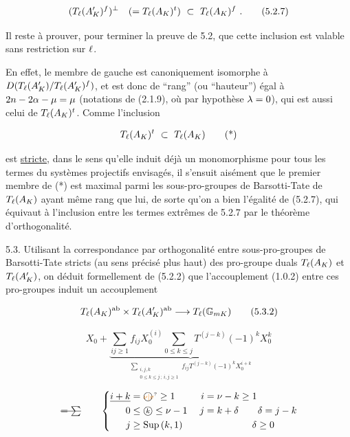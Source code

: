 \[
(T_{\handwritten{\ell}}(A'_K)^f)^{\handwritten{\perp}}\quad(=T_{\handwritten{\ell}}(A_K)^t)\ \handwritten{\subset}\ T_{\handwritten{\ell}}(A_K)^f\ .\tag*{(5.2.7)}
\]

Il reste à prouver, pour terminer la preuve de 5.2, que cette inclusion est valable sans restriction sur $\ell$.

En effet, le membre de gauche est canoniquement isomorphe à $D(T_{\ell}(A'_K)/T_{\ell}(A'_K)^f)$, et est donc de ``rang'' (ou ``hauteur'') égal à $2n-2\alpha-\mu=\mu$ (notations de (2.1.9), où par hypothèse $\lambda=0$), qui est aussi celui de $T_{\ell}(A_K)^t$. Comme l'inclusion

\[
T_{\handwritten{\ell}}(A_K)^t\ \handwritten{\subset}\ T_{\handwritten{\ell}}(A_K)\tag*{(*)}
\]

est \uline{stricte}, dans le sens qu'elle induit déjà un monomorphisme pour tous les termes du systèmes projectifs envisagés, il s'ensuit aisément que le premier membre de (*) est maximal parmi les sous-pro-groupes de Barsotti-Tate de $T_{\ell}(A_K)$ ayant même rang que lui, de sorte qu'on a bien l'égalité de (5.2.7), qui équivaut à l'inclusion entre les termes extrêmes de 5.2.7 par le théorème d'orthogonalité.

5.3. Utilisant la correspondance par orthogonalité entre sous-pro-groupes de Barsotti-Tate stricts (au sens précisé plus haut) des pro-groupe duals $T_{\ell}(A_K)$ et $T_{\ell}(A'_K)$, on déduit formellement de (5.2.2) que l'accouplement (1.0.2) entre ces pro-groupes induit un accouplement

\[
T_{\ell}(A_K)^{\mathrm{ab}}\times T_{\ell}(A'_K)^{\mathrm{ab}}\longrightarrow T_{\ell}(\mathbb{G}_{mK})\tag*{(5.3.2)}
\]



\[
X_0+\underbrace{\sum_{ij\geq1}f_{ij}X_0^{(i)}\sum_{0\leq k\leq j}T^{(j-k)}(-1)^k X_0^k}_{\displaystyle\sum_{\substack{i,j,k\\0\leq k\leq j\,;\ i,j\geq1}}f_{ij}T^{(j-k)}(-1)^k X_0^{i+k}}
\]

\[
\deleted{=\sum}\qquad
\left\{\begin{aligned}
\underline{i+k}&=\text{\textcircled{\ensuremath{\scriptstyle\unsure{\nu|v}}}} \geq 1\\
0&\leq\text{\textcircled{\ensuremath{\scriptstyle k}}}\leq\nu-1\\
j&\geq\mathrm{Sup}\,(k,1)
\end{aligned}\right.\quad
\begin{aligned}
i&=\nu-k\geq1\\
j&=k+\delta\qquad\delta=j-k\\
&\hspace{5em}\delta\geq0
\end{aligned}
\]


